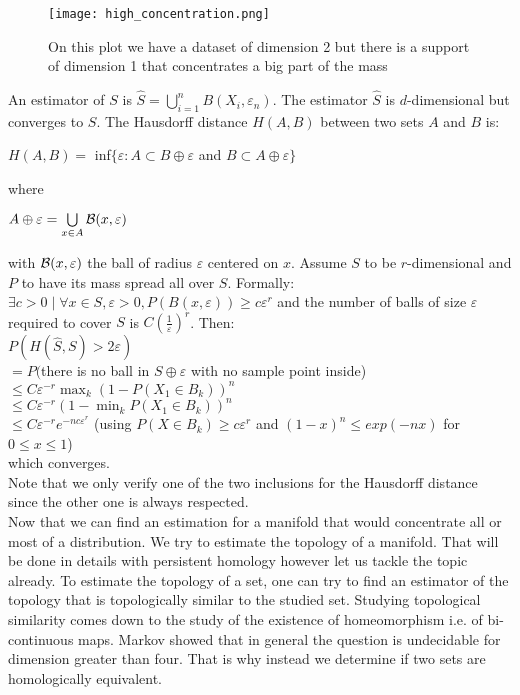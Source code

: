 \documentclass[12pt, a4paper]{article}
\begin{document}
\begin{figure}[p]
  \centering
  \texttt{[image: high\_concentration.png]}
  \caption{On this plot we have a dataset of dimension 2 but there is a support of dimension 1 that concentrates a big part of the mass}
  \label{fig:high_concentration}
\end{figure}

\newpage

An estimator of $S$ is $\widehat{S} = \bigcup^n_{i=1} B(X_i, \varepsilon_n)$. The estimator $\widehat{S}$ is $d$-dimensional but converges to $S$. The Hausdorff distance $H(A,B)$ between two sets $A$ and $B$ is:

\begin{center}
  $H(A,B) =$ inf$ \lbrace \varepsilon : A \subset B \oplus \varepsilon$ and $B \subset A \oplus \varepsilon \rbrace$ 
\end{center}

where 

\begin{center}
  $A \oplus \varepsilon = \bigcup\limits_{x \in A} \mathcal{B}(x,\varepsilon)$ 
\end{center}

with $\mathcal{B}(x, \varepsilon)$ the ball of radius $\varepsilon$ centered on $x$. Assume $S$ to be $r$-dimensional and $P$ to have its mass spread all over $S$. Formally: $\exists c > 0 \mid \forall x \in S, \varepsilon > 0, P(B(x, \varepsilon)) \ge c\varepsilon^r$ and the number of balls of size $\varepsilon$ required to cover $S$ is $C(\frac{1}{\varepsilon})^r$. Then:\\

  $P(H(\widehat{S},S) > 2\varepsilon)$\\
  $= P($there is no ball in $S \oplus \varepsilon$ with no sample point inside)\\
  $\le C\varepsilon^{-r} \max_k (1-P(X_1 \in B_k))^n$\\
  $\le C\varepsilon^{-r} (1-\min_k P(X_1 \in B_k))^n$\\
  $\le C\varepsilon^{-r}e^{-nc\varepsilon^r}$ (using $P(X\in B_k) \ge c\varepsilon^r$ and $(1-x)^n \le exp(-nx)$ for $0 \le x \le 1$)
\\
which converges.\\

Note that we only verify one of the two inclusions for the Hausdorff distance since the other one is always respected.\\

Now that we can find an estimation for a manifold that would concentrate all or most of a distribution. We try to estimate the topology of a manifold. That will be done in details with persistent homology however let us tackle the topic already. To estimate the topology of a set, one can try to find an estimator of the topology that is topologically similar to the studied set. Studying topological similarity comes down to the study of the existence of homeomorphism i.e. of bi-continuous maps. Markov \cite{markov_insolubility_2001} showed that in general the question is undecidable for dimension greater than four. That is why instead we determine if two sets are homologically equivalent.\\
\end{document}
